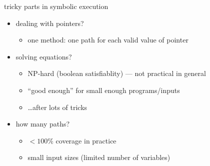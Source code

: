 \begin{frame}{tricky parts in symbolic execution}
    \begin{itemize}
    \item dealing with pointers?
        \begin{itemize}
        \item one method: one path for each valid value of pointer
        \end{itemize}
    \item solving equations?
        \begin{itemize}
        \item NP-hard (boolean satisfiablity) --- not practical in general
        \item ``good enough'' for small enough programs/inputs
        \item \ldots after lots of tricks
        \end{itemize}
    \item how many paths?
        \begin{itemize}
        \item $<100\%$ coverage in practice
        \item small input sizes (limited number of variables)
        \end{itemize}
    \end{itemize}
\end{frame}

